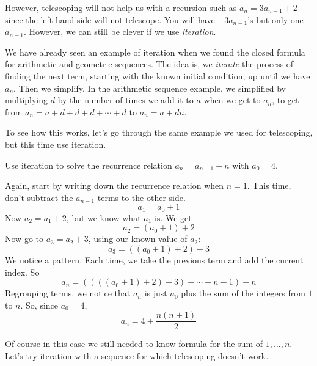 \documentclass[12pt]{article}
\begin{document}
However, telescoping will not help us with a recursion such as $a_n = 3a_{n-1} + 2$ since the left hand side will not telescope.  You will have $-3a_{n-1}$'s but only one $a_{n-1}$.  However, we can still be clever if we use {\em iteration}.
%

We have already seen an example of iteration when we found the closed formula for arithmetic and geometric sequences.  The idea is, we {\em iterate} the process of finding the next term, starting with the known initial condition, up until we have $a_n$.  Then we simplify.  In the arithmetic sequence example, we simplified by multiplying $d$ by the number of times we add it to $a$ when we get to $a_n$, to get from $a_n = a + d + d + d + \cdots + d$ to $a_n = a + dn$.

To see how this works, let's go through the same example we used for telescoping, but this time use iteration.

\begin{example}
  Use iteration to solve the recurrence relation $a_n = a_{n-1} + n$ with $a_0 = 4$.
  
  \begin{solution}
    Again, start by writing down the recurrence relation when $n = 1$.  This time, don't subtract the $a_{n-1}$ terms to the other side.
    \[a_1 = a_0 + 1\]
    Now $a_2 = a_1 + 2$, but we know what $a_1$ is.  We get
    \[a_2 = (a_0 + 1) + 2\]
    Now go to $a_3 = a_2 + 3$, using our known value of $a_2$:
    \[a_3 = ((a_0 + 1) + 2) + 3\]
    We notice a pattern.  Each time, we take the previous term and add the current index.  So
    \[a_n = ((((a_0 + 1) +2)+3)+\cdots + n-1) + n\]
    Regrouping terms, we notice that $a_n$ is just $a_0$ plus the sum of the integers from $1$ to $n$.  So, since $a_0 = 4$, 
    \[a_n = 4 + \frac{n(n+1)}{2}\]
  \end{solution}

\end{example}

 Of course in this case we still needed to know formula for the sum of $1,\ldots,n$.  Let's try iteration with a sequence for which telescoping doesn't work.
 
\end{document}
